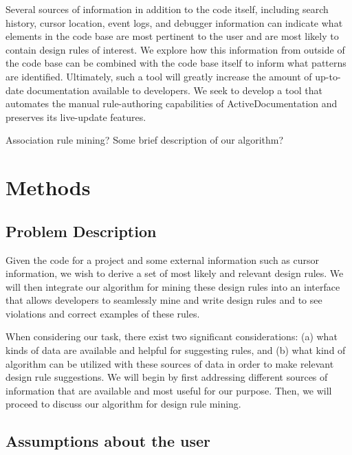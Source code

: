 \documentclass[12pt]{article}
\begin{document}
Several sources of information in addition to the code itself, including search history, cursor location, event logs, and debugger information can indicate what elements in the code base are most pertinent to the user and are most likely to contain design rules of interest. We explore how this information from outside of the code base can be combined with the code base itself to inform what patterns are identified. Ultimately, such a tool will greatly increase the amount of up-to-date documentation available to developers. We seek to develop a tool that automates the manual rule-authoring capabilities of ActiveDocumentation \cite{MehrpurEtAl2019} and preserves its live-update features.

Association rule mining? Some brief description of our algorithm?
 
 \clearpage


\section{Methods}\label{methods}

\subsection{Problem Description} \label{probDesc}

Given the code for a project and some external information such as cursor information, we wish to derive a set of most likely and relevant design rules. We will then integrate our algorithm for mining these design rules into an interface that allows developers to seamlessly mine and write design rules and to see violations and correct examples of these rules. 

When considering our task, there exist two significant considerations: (a) what kinds of data are available and helpful for suggesting rules, and (b) what kind of algorithm can be utilized with these sources of data in order to make relevant design rule suggestions. We will begin by first addressing different sources of information that are available and most useful for our purpose. Then, we will proceed to discuss our algorithm for design rule mining.

\subsection{Assumptions about the user} \label{assumptions}
\end{document}
